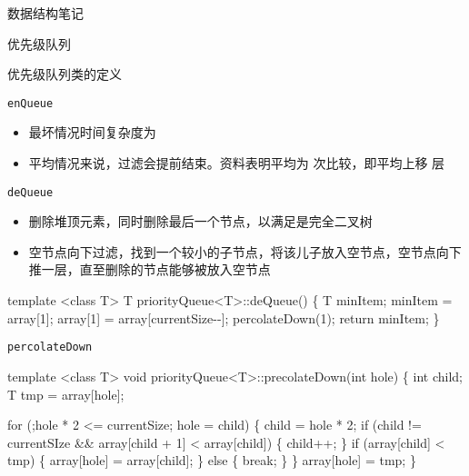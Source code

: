 \documentclass[
  ignorenonframetext,
]{beamer}
\newenvironment{Shaded}{}{}
\newcommand{\NormalTok}[1]{#1}
\providecommand{\tightlist}{%
  \setlength{\itemsep}{0pt}\setlength{\parskip}{0pt}}
\begin{document}
\begin{frame}[fragile]{数据结构笔记}
\begin{block}{优先级队列}
\begin{block}{优先级队列类的定义}
\begin{block}{\texttt{enQueue}}
\begin{itemize}
\tightlist
\item
  最坏情况时间复杂度为 {}
\item
  平均情况来说，过滤会提前结束。资料表明平均为 {} 次比较，即平均上移 {}
  层
\end{itemize}
\end{block}

\begin{block}{\texttt{deQueue}}
\protect{}\label{dequeue-2}
\begin{itemize}
\tightlist
\item
  删除堆顶元素，同时删除最后一个节点，以满足是完全二叉树
\item
  空节点向下过滤，找到一个较小的子节点，将该儿子放入空节点，空节点向下推一层，直至删除的节点能够被放入空节点
\end{itemize}

\begin{Shaded}
\begin{Highlighting}[]
\NormalTok{template \textless{}class T\textgreater{}}
\NormalTok{T priorityQueue\textless{}T\textgreater{}::deQueue()}
\NormalTok{\{}
\NormalTok{  T minItem;}
\NormalTok{  minItem = array[1];}
\NormalTok{  array[1] = array[currentSize{-}{-}];}
\NormalTok{  percolateDown(1);}
\NormalTok{  return minItem;}
\NormalTok{\}}
\end{Highlighting}
\end{Shaded}
\end{block}

\begin{block}{\texttt{percolateDown}}
\protect{}\label{percolatedown}
\begin{Shaded}
\begin{Highlighting}[]
\NormalTok{template \textless{}class T\textgreater{}}
\NormalTok{void priorityQueue\textless{}T\textgreater{}::precolateDown(int hole)}
\NormalTok{\{}
\NormalTok{  int child;}
\NormalTok{  T tmp = array[hole];}

\NormalTok{  for (;hole * 2 \textless{}= currentSize; hole = child)}
\NormalTok{  \{}
\NormalTok{    child = hole * 2;}
\NormalTok{    if (child != currentSIze \&\& array[child + 1] \textless{} array[child])}
\NormalTok{    \{}
\NormalTok{      child++;}
\NormalTok{    \}}
\NormalTok{    if (array[child] \textless{} tmp)}
\NormalTok{    \{}
\NormalTok{      array[hole] = array[child];}
\NormalTok{    \}}
\NormalTok{    else}
\NormalTok{    \{}
\NormalTok{      break;}
\NormalTok{    \}}
\NormalTok{  \}}
\NormalTok{  array[hole] = tmp;}
\NormalTok{\}}
\end{Highlighting}
\end{Shaded}
\end{block}


\end{block}
\end{block}
\end{frame}
\end{document}
